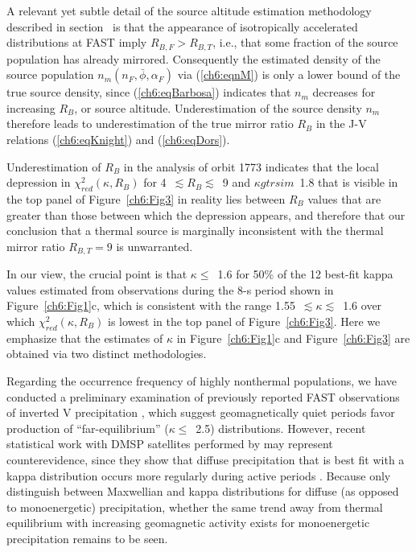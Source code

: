  A relevant yet subtle detail of the source altitude estimation methodology
  described in section~\label{ssSourceAlt} is that the appearance of
  isotropically accelerated distributions at FAST imply $R_{B,F} > R_{B,T}$,
  i.e., that some fraction of the source population has already
  mirrored. Consequently the estimated density of the source population
  $n_m ( n_F, \bar{\phi}, \alpha_F )$ via (\ref{ch6:eqnM}) is only a lower bound
  of the true source density, since (\ref{ch6:eqBarbosa}) indicates that $n_m$
  decreases for increasing $R_B$, or source altitude. Underestimation of the
  source density $n_m$ therefore leads to underestimation of the true mirror
  ratio $R_B$ in the J-V relations (\ref{ch6:eqKnight}) and (\ref{ch6:eqDors}).

  Underestimation of $R_B$ in the analysis of orbit 1773 indicates that the local
  depression in $\chi^2_{red} (\kappa, R_B)$ for 4~$\lesssim R_B \lesssim$~9 and
  $\kappa gtrsim$~1.8 that is visible in the top panel of Figure~\ref{ch6:Fig3}
  in reality lies between $R_B$ values that are greater than those between which
  the depression appears, and therefore that our conclusion that a thermal
  source is marginally inconsistent with the thermal mirror ratio $R_{B,T} = 9$ 
  is unwarranted.

  In our view, the crucial point is that $\kappa \leq$~1.6 for 50\% of the 12
  best-fit kappa values estimated from observations during the 8-s period shown
  in Figure~\ref{ch6:Fig1}c, which is consistent with the range
  1.55~$\lesssim \kappa \lesssim$~1.6 over which $\chi^2_{red} (\kappa, R_B)$ is
  lowest in the top panel of Figure~\ref{ch6:Fig3}. Here we emphasize that the
  estimates of $\kappa$ in Figure~\ref{ch6:Fig1}c and Figure~\ref{ch6:Fig3} are
  obtained via two distinct methodologies. 
  
  Regarding the occurrence frequency of highly nonthermal populations, we have
  conducted a preliminary examination of previously reported FAST observations
  of inverted V precipitation
  \citep{McFadden1998a,Carlson2001,Janhunen2001,Dombeck2013}, which suggest
  geomagnetically quiet periods favor production of ``far-equilibrium''
  ($\kappa \leq$~2.5) distributions. However, recent statistical work with DMSP
  satellites performed by \citet{McIntosh2014} may represent counterevidence,
  since they show that diffuse precipitation that is best fit with a kappa
  distribution occurs more regularly during active periods \citep[e.g., Figure~7
  in][]{McIntosh2014}. Because \citet{McIntosh2014} only distinguish between
  Maxwellian and kappa distributions for diffuse (as opposed to monoenergetic)
  precipitation, whether the same trend away from thermal equilibrium with
  increasing geomagnetic activity exists for monoenergetic precipitation remains
  to be seen.

